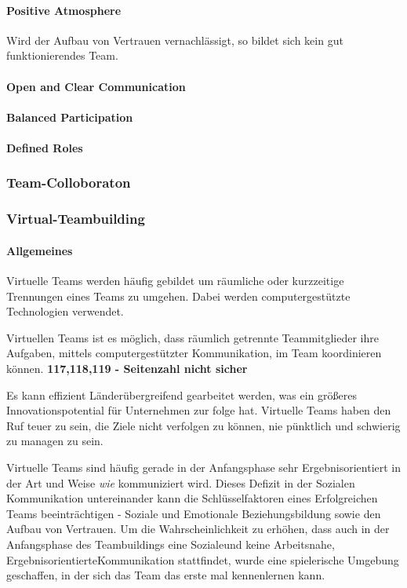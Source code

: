 \documentclass[a4paper,11pt]{article}%
\renewcommand{\\}{\vspace*{0.5\baselineskip} \newline}
\begin{document}
	\paragraph{Positive Atmosphere}
	Wird der Aufbau von Vertrauen vernachlässigt, so bildet sich kein gut funktionierendes Team.
	\paragraph{Open and Clear Communication}
	\paragraph{Balanced Participation}
	\paragraph{Defined Roles}
	
		\subsubsection{Team-Colloboraton}
		\subsubsection{Virtual-Teambuilding}
		
		\paragraph{Allgemeines}
		Virtuelle Teams werden häufig gebildet um räumliche oder kurzzeitige Trennungen eines Teams zu umgehen. Dabei werden computergestützte Technologien verwendet. \citep[p. 1-2]{cascio2003leadership}
		
		Virtuellen Teams ist es möglich, dass räumlich getrennte Teammitglieder ihre Aufgaben, mittels computergestützter Kommunikation, im Team koordinieren können. \citep[p. 117-119]{peters2007identifying} \textbf{117,118,119 - Seitenzahl nicht sicher}
		
		Es kann effizient Länderübergreifend gearbeitet werden, was ein größeres Innovationspotential für Unternehmen zur folge hat.	
		Virtuelle Teams haben den Ruf teuer zu sein, die Ziele nicht verfolgen zu können, nie pünktlich und schwierig zu managen zu sein. \citep[p.243-244]{gassmann2003trends}
		
		Virtuelle Teams sind häufig gerade in der Anfangsphase sehr Ergebnisorientiert in der Art und Weise \textit{wie} kommuniziert wird. Dieses Defizit in der Sozialen Kommunikation untereinander kann die Schlüsselfaktoren eines Erfolgreichen Teams beeinträchtigen - Soziale und Emotionale Beziehungsbildung sowie den Aufbau von Vertrauen. \citep[p.378]{ren2007applying} \\
		Um die Wahrscheinlichkeit zu erhöhen, dass auch in der Anfangsphase des Teambuildings eine \glqq Soziale\grqq und keine \glqq Arbeitsnahe, Ergebnisorientierte\grqq Kommunikation stattfindet, wurde eine spielerische Umgebung geschaffen, in der sich das Team das erste mal kennenlernen kann. 
		
\end{document}
